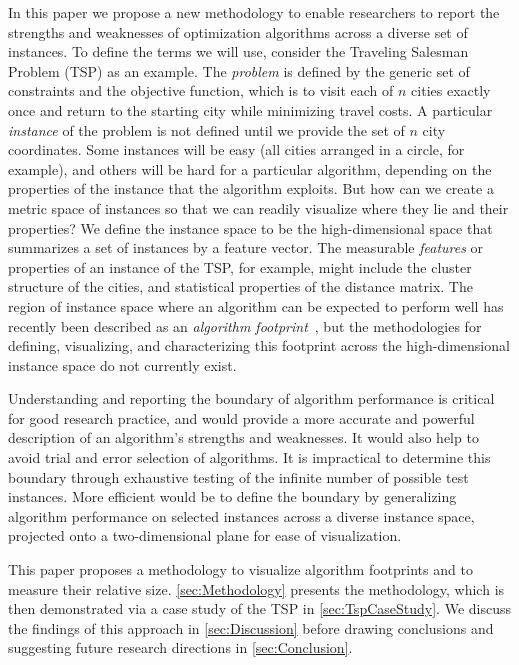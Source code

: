 \documentclass[conference]{IEEEtran}
\begin{document}
In this paper we propose a new methodology to enable researchers to report the strengths and weaknesses of optimization algorithms across a diverse set of instances. To define the terms we will use, consider the Traveling Salesman Problem (TSP) as an example. The \emph{problem} is defined by the generic set of constraints and the objective function, which is to visit each of $n$ cities exactly once and return to the starting city while minimizing travel costs. A particular \emph{instance} of the problem is not defined until we provide the set of $n$ city coordinates. Some instances will be easy (all cities arranged in a circle, for example), and others will be hard for a particular algorithm, depending on the properties of the instance that the algorithm exploits. But how can we create a metric space of instances so that we can readily visualize where they lie and their properties? We define the instance space to be the high-dimensional space that summarizes a set of instances by a feature vector. The measurable \emph{features} or properties of an instance of the TSP, for example, might include the cluster structure of the cities, and statistical properties of the distance matrix. The region of instance space where an algorithm can be expected to perform well has recently been described as an \emph{algorithm footprint}~\cite{Corne}, but the methodologies for defining, visualizing, and characterizing this footprint across the high-dimensional instance space do not currently exist.

Understanding and reporting the boundary of algorithm performance is critical for good research practice, and would provide a more accurate and powerful description of an algorithm's strengths and weaknesses. It would also help to avoid trial and error selection of algorithms. It is impractical to determine this boundary through exhaustive testing of the infinite number of possible test instances. More efficient would be to define the boundary by generalizing algorithm performance on selected instances across a diverse instance space, projected onto a two-dimensional plane for ease of visualization.

This paper proposes a methodology to visualize algorithm footprints and to measure their relative size. \autoref{sec:Methodology} presents the methodology, which is then demonstrated via a case study of the TSP in \autoref{sec:TspCaseStudy}. We discuss the findings of this approach in \autoref{sec:Discussion} before drawing conclusions and suggesting future research directions in \autoref{sec:Conclusion}.
\end{document}
